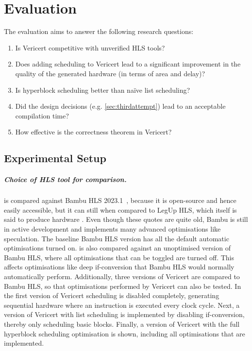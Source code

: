 \graphicspath{{./figures/5-hyperblock-scheduling/}}

\chapter{Evaluation}%
\label{sec:evaluation}%
\label{sec:performance-comparison}

The evaluation aims to answer the following research questions:

\begin{enumerate}[label=\textbf{RQ\arabic*}]
\item Is Vericert competitive with unverified HLS tools?
\item Does adding scheduling to Vericert lead to a significant improvement in
  the quality of the generated hardware (in terms of area and delay)?
\item Is hyperblock scheduling better than na\"ive list scheduling?
\item Did the design decisions (e.g. \cref{sec:thirdattempt}) lead to an
  acceptable compilation time?
\item How effective is the correctness theorem in Vericert?
\end{enumerate}

\section{Experimental Setup}

\def\polybench{PolyBench/C}

\paragraph{Choice of HLS tool for comparison.} \vericert{} is compared against
Bambu HLS 2023.1~\cite{ferrandi21_bambu}, because it is open-source and hence
easily accessible, but it can still
 when compared to LegUp HLS, which itself is said to produce
hardware .  Even though these quotes are quite
old, Bambu is still in active development and implements many advanced
optimisations like speculation.  The baseline Bambu HLS version has all the
default automatic optimisations turned on.  \vericert{} is also compared against
an unoptimised version of Bambu HLS, where all optimisations that can be toggled
are turned off.  This affects optimisations like deep if-conversion that Bambu
HLS would normally automatically perform.  Additionally, three versions of
Vericert are compared to Bambu HLS, so that optimisations performed by Vericert
can also be tested.  In the first version of Vericert scheduling is disabled
completely, generating sequential hardware where an instruction is executed
every clock cycle.  Next, a version of Vericert with list scheduling is
implemented by disabling if-conversion, thereby only scheduling basic blocks.
Finally, a version of Vericert with the full hyperblock scheduling optimisation
is shown, including all optimisations that are implemented.

